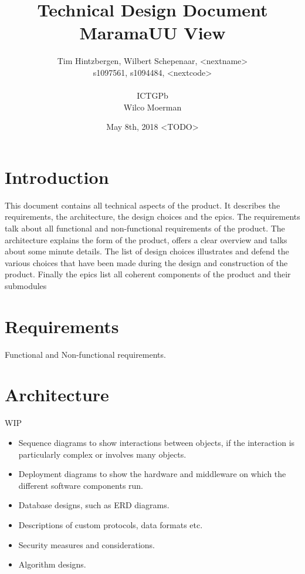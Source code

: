 \documentclass[10pt]{extarticle} %
\title{\huge Technical Design Document MaramaUU View}
\author{Tim Hintzbergen, Wilbert Schepenaar, <nextname>    \\s1097561, s1094484, <nextcode>
\\\\ICTGPb
\\Wilco Moerman}
\date{May 8th, 2018 <TODO>}
\begin{document}
    \maketitle
    \thispagestyle{empty}
    \newpage
    \newpage
    \setcounter{page}{1}
    \section {Introduction}
    This document contains all technical aspects of the product.
    It describes the requirements, the architecture, the design choices and the epics.
    The requirements talk about all functional and non-functional requirements of the product.
    The architecture explains the form of the product, offers a clear overview and talks about some minute details.
    The list of design choices illustrates and defend the various choices that have been made during the design and construction of the product.
    Finally the epics list all coherent components of the product and their submodules
    \newpage

    \tableofcontents{}
    \newpage

    \section{Requirements}
    Functional and Non-functional requirements.
    \newpage

    \section{Architecture}
    WIP
    \begin{itemize}
              \item Sequence diagrams to show interactions between objects, if the interaction is particularly complex or involves many objects.
              \item Deployment diagrams to show the hardware and middleware on which the different software components run.
              \item Database designs, such as ERD diagrams.
              \item Descriptions of custom protocols, data formats etc.
              \item Security measures and considerations.
              \item Algorithm designs.
    \end{itemize}
\end{document}
